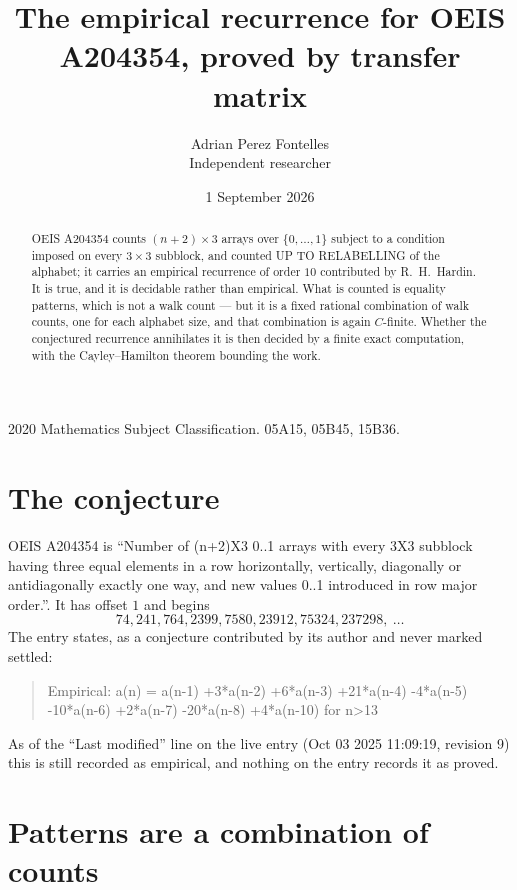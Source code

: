 \documentclass[11pt,a4paper]{article}
\title{The empirical recurrence for OEIS A204354, proved by transfer matrix}
\author{Adrian Perez Fontelles\\ \small Independent researcher}
\date{1 September 2026}
\theoremstyle{plain}
\theoremstyle{definition}
\begin{document}
\maketitle

\begin{abstract}
OEIS A204354 counts $(n+2)\times3$ arrays over $\{0,\dots,1\}$ subject to a condition imposed on
every $3\times3$ subblock, and counted UP TO RELABELLING of the
alphabet; it carries an empirical recurrence of order $10$ contributed by
R.~H.~Hardin. It is true, and it is decidable rather than empirical. What is counted is
equality patterns, which is not a walk count --- but it is a fixed rational combination of
walk counts, one for each alphabet size, and that combination is again $C$-finite. Whether the
conjectured recurrence annihilates it is then decided by a finite exact computation, with the
Cayley--Hamilton theorem bounding the work.
\end{abstract}

\noindent\small 2020 Mathematics Subject Classification. 05A15, 05B45, 15B36.\normalsize

\section{The conjecture}

OEIS A204354 is ``Number of (n+2)X3 0..1 arrays with every 3X3 subblock having three equal elements in a row horizontally, vertically, diagonally or antidiagonally exactly one way, and new values 0..1 introduced in row major order.''. It has offset $1$ and begins
\[
74, 241, 764, 2399, 7580, 23912, 75324, 237298,\ \dots
\]
The entry states, as a conjecture contributed by its author and never marked settled:
\begin{quote}
Empirical: a(n) = a(n-1) +3*a(n-2) +6*a(n-3) +21*a(n-4) -4*a(n-5) -10*a(n-6) +2*a(n-7) -20*a(n-8) +4*a(n-10) for n>13
\end{quote}
As of the ``Last modified'' line on the live entry (Oct 03 2025 11:09:19, revision 9) this is still
recorded as empirical, and nothing on the entry records it as proved.

\section{Patterns are a combination of counts}
\end{document}
